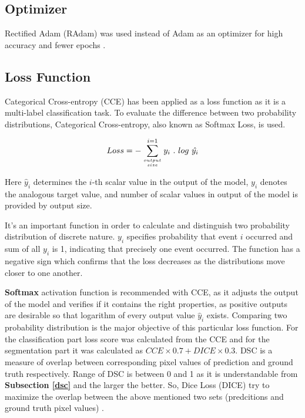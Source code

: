 \documentclass[conference]{IEEEtran}
\begin{document}
\subsection{Optimizer}  
Rectified Adam (RAdam) was used instead of Adam as an optimizer for high accuracy and fewer epochs \cite{liu2019variance}.   







\subsection{Loss Function}
Categorical Cross-entropy (CCE) has been applied as a loss function as it is a multi-label classification task.  To evaluate the difference between two probability distributions, Categorical Cross-entropy, also known as Softmax Loss, is used.


\begin{center}
\begin{equation}
   Loss = - \sum_{output \atop size}^{i=1} y_{i}\ .\ log\ \hat{y_{i}} 
\end{equation}
\end{center}

Here \(\hat{y}_i\) determines the \(i\)-th scalar value in the output of the model, \(y_i\) denotes the analogous target value, and number of scalar values in output of the model is provided by output size.


It's an important function in order to calculate and distinguish two probability distribution of discrete nature. \(y_i\) specifies probability that event \(i\) occurred and sum of all \(y_i\) is 1, indicating that precisely one event occurred. The function has a negative sign which confirms that the loss decreases as the distributions move closer to one another.

\textbf{Softmax} activation function is recommended with CCE, as it adjusts the output of the model and verifies if it contains the right properties, as positive outputs are desirable so that logarithm of every output value \(\hat{y}_i\) exists. Comparing two probability distribution is the major objective of this particular loss function. For the classification part loss score was calculated from the CCE and for the segmentation part it was calculated as $CCE \times 0.7 + DICE \times 0.3$.
DSC is a measure of overlap between corresponding pixel values of prediction and ground truth respectively. Range of DSC is between 0 and 1 as it is understandable from \textbf{Subsection \ref{dsc}} and the larger the better. So, Dice Loss (DICE) try to maximize the overlap between the above mentioned two sets (predcitions and ground truth pixel values) \cite{sudre2017generalised}.
\end{document}
